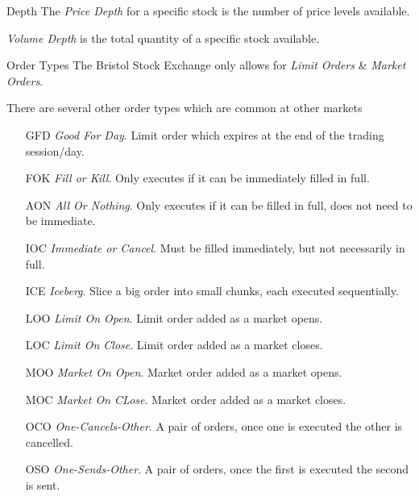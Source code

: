 \documentclass[11pt,a4paper]{article}
\begin{document}
\begin{definition}{Depth}
  The \textit{Price Depth} for a specific stock is the number of price levels available.
  \par \textit{Volume Depth} is the total quantity of a specific stock available.
\end{definition}

\begin{proposition}{Order Types}
  The Bristol Stock Exchange only allows for \textit{Limit Orders} \& \textit{Market Orders}.
  \par There are several other order types which are common at other markets
  \begin{itemize}
    \item[GFD] \textit{Good For Day}. Limit order which expires at the end of the trading session/day.
    \item[FOK] \textit{Fill or Kill}. Only executes if it can be immediately filled in full.
    \item[AON] \textit{All Or Nothing}. Only executes if it can be filled in full, does not need to be immediate.
    \item[IOC] \textit{Immediate or Cancel}. Must be filled immediately, but not necessarily in full.
    \item[ICE] \textit{Iceberg}. Slice a big order into small chunks, each executed sequentially.
    \item[LOO] \textit{Limit On Open}. Limit order added as a market opens.
    \item[LOC] \textit{Limit On Close}. Limit order added as a market closes.
    \item[MOO] \textit{Market On Open}. Market order added as a market opens.
    \item[MOC] \textit{Market On CLose}. Market order added as a market closes.
    \item[OCO] \textit{One-Cancels-Other}. A pair of orders, once one is executed the other is cancelled.
    \item[OSO] \textit{One-Sends-Other}. A pair of orders, once the first is executed the second is sent.
  \end{itemize}
\end{proposition}
\end{document}
